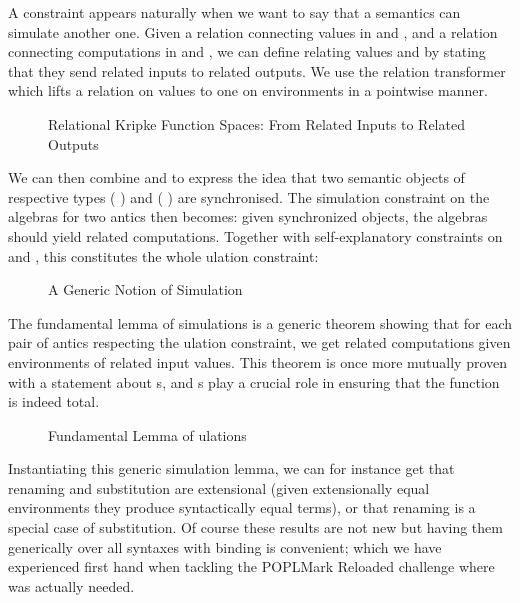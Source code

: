 A  constraint appears naturally when we want to say that a
semantics can simulate another one. Given a relation  connecting values
in  and , and a relation  connecting computations in
 and , we can define  relating values
   and   
by stating that they send related inputs to related outputs. We use
the relation transformer  which lifts a relation on values
to one on environments in a pointwise manner.

\begin{figure}[h]
\caption{Relational Kripke Function Spaces: From Related Inputs to Related Outputs}
\end{figure}

We can then combine  and  to express the idea
that two semantic objects of respective types
   (  ) and
   (  ) are
synchronised. The simulation constraint on the algebras for two antics 
then becomes: given synchronized objects, the algebras should yield
related computations. Together with self-explanatory constraints on
 and , this constitutes the whole ulation
constraint:

\begin{figure}[h]
\caption{A Generic Notion of Simulation}
\end{figure}

The fundamental lemma of simulations is a generic theorem showing that for
each pair of antics respecting the ulation constraint, we
get related computations given environments of related input values. This
theorem is once more mutually proven with a statement about s,
and s play a crucial role in ensuring that the function is indeed total.

\begin{figure}[h]
\caption{Fundamental Lemma of ulations}
\end{figure}

Instantiating this generic simulation lemma, we can for instance get
that renaming and substitution are extensional (given extensionally
equal environments they produce syntactically equal terms), or that
renaming is a special case of substitution. Of course these results
are not new but having them generically over all syntaxes with binding
is convenient; which we have experienced first hand when tackling the
POPLMark Reloaded challenge where  was actually needed.

